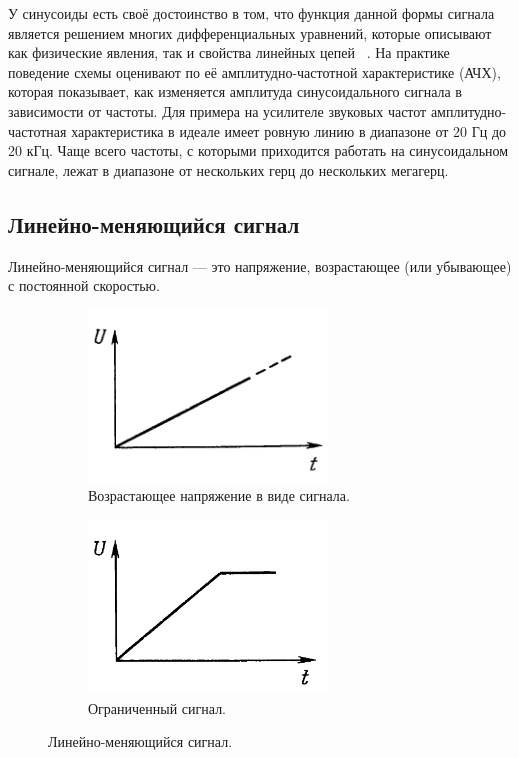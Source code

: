 	У синусоиды есть своё достоинство в том, что функция данной формы сигнала является решением многих дифференциальных уравнений, которые описывают как физические явления, так и свойства линейных цепей ~\cite{is1}. На практике поведение схемы оценивают по её амплитудно-частотной характеристике (АЧХ), которая показывает, как изменяется амплитуда синусоидального сигнала в зависимости от частоты. Для примера на усилителе звуковых частот амплитудно-частотная характеристика в идеале имеет ровную линию в диапазоне от 20 Гц до 20 кГц. Чаще всего частоты, с которыми приходится работать на синусоидальном сигнале, лежат в диапазоне от нескольких герц до нескольких мегагерц.

\subsection{Линейно-меняющийся сигнал}
	Линейно-меняющийся сигнал --- это напряжение, возрастающее (или убывающее) с постоянной скоростью.

\begin{figure}[H]\captionsetup[subfigure]{font=normalsize}
     \begin{subfigure}[H]{0.45\textwidth}
         \centering
         \includegraphics[width=0.70\textwidth]{../image/s_la.png}
         \caption{Возрастающее напряжение в виде сигнала.}
     \end{subfigure}
     \hfill
     \begin{subfigure}[H]{0.45\textwidth}
         \centering
         \includegraphics[width=0.70\textwidth]{../image/s_lb.png}
         \caption{Ограниченный сигнал.}
     \end{subfigure}
        \caption{Линейно-меняющийся сигнал.}
\end{figure}

